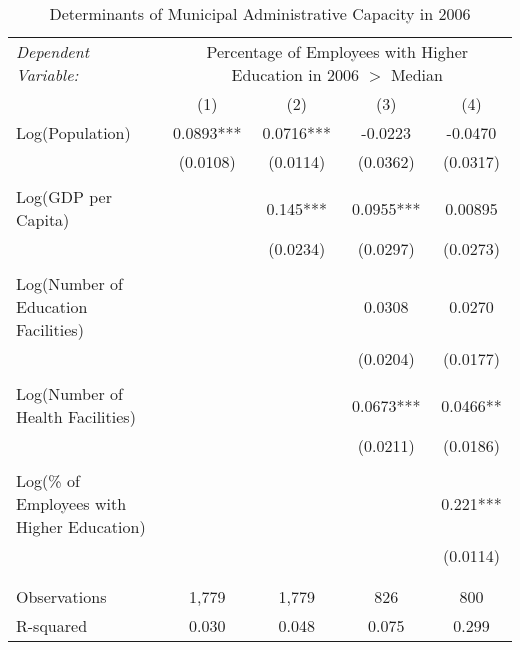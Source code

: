 \documentclass[]{article}
\begin{document}
\begin{table}[ht!]
\centering
\caption{Determinants of Municipal Administrative Capacity in 2006}
\begin{adjustbox}{max width=\textwidth}
\begin{tabular}{lcccc}
\toprule
\textit{Dependent Variable:} & \multicolumn{4}{c}{Percentage of Employees with Higher Education in 2006 $>$ Median} \\
\cmidrule(lr){2-5}
& (1) & (2) & (3) & (4) \\
\midrule
Log(Population) & 0.0893*** & 0.0716*** & -0.0223 & -0.0470 \\
 & (0.0108) & (0.0114) & (0.0362) & (0.0317) \\\\
Log(GDP per Capita) &  & 0.145*** & 0.0955*** & 0.00895 \\
 &  & (0.0234) & (0.0297) & (0.0273) \\\\
 Log(Number of Education Facilities) &  &  & 0.0308 & 0.0270 \\
 &  &  & (0.0204) & (0.0177) \\\\
Log(Number of Health Facilities) &  &  & 0.0673*** & 0.0466** \\
 &  &  & (0.0211) & (0.0186) \\\\
Log(\% of Employees with Higher Education) &  &  &  & 0.221*** \\
 &  &  &  & (0.0114) \\\\
 &  &  &  &  \\
\midrule
Observations & 1,779 & 1,779 & 826 & 800 \\
R-squared & 0.030 & 0.048 & 0.075 & 0.299 \\
\bottomrule
\end{tabular}
\end{adjustbox}
\end{table}
\end{document}
